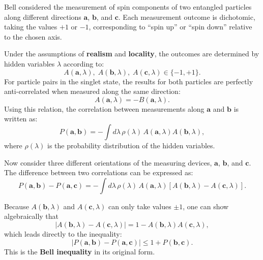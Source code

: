 Bell considered the measurement of spin components of two entangled particles along different directions $\mathbf{a}$, $\mathbf{b}$, and $\mathbf{c}$.  
Each measurement outcome is dichotomic, taking the values $+1$ or $-1$, corresponding to ``spin up'' or ``spin down'' relative to the chosen axis.

Under the assumptions of \textbf{realism} and \textbf{locality}, the outcomes are determined by hidden variables $\lambda$ according to:
\[
A(\mathbf{a},\lambda), \; A(\mathbf{b},\lambda), \; A(\mathbf{c},\lambda) \in \{-1, +1\}.
\]
For particle pairs in the singlet state, the results for both particles are perfectly anti-correlated when measured along the same direction:
\[
A(\mathbf{a},\lambda) = -B(\mathbf{a},\lambda).
\]
Using this relation, the correlation between measurements along $\mathbf{a}$ and $\mathbf{b}$ is written as:
\[
P(\mathbf{a},\mathbf{b}) = -\int d\lambda\, \rho(\lambda)\, A(\mathbf{a},\lambda)A(\mathbf{b},\lambda),
\]
where $\rho(\lambda)$ is the probability distribution of the hidden variables.

Now consider three different orientations of the measuring devices, $\mathbf{a}$, $\mathbf{b}$, and $\mathbf{c}$.  
The difference between two correlations can be expressed as:
\[
P(\mathbf{a},\mathbf{b}) - P(\mathbf{a},\mathbf{c})
= -\int d\lambda\, \rho(\lambda)\, A(\mathbf{a},\lambda)\left[A(\mathbf{b},\lambda) - A(\mathbf{c},\lambda)\right].
\]

Because $A(\mathbf{b},\lambda)$ and $A(\mathbf{c},\lambda)$ can only take values $\pm 1$, one can show algebraically that
\[
|A(\mathbf{b},\lambda) - A(\mathbf{c},\lambda)| = 1 - A(\mathbf{b},\lambda)A(\mathbf{c},\lambda),
\]
which leads directly to the inequality:
\[
|P(\mathbf{a},\mathbf{b}) - P(\mathbf{a},\mathbf{c})| \le 1 + P(\mathbf{b},\mathbf{c}).
\]
This is the \textbf{Bell inequality} in its original form.

